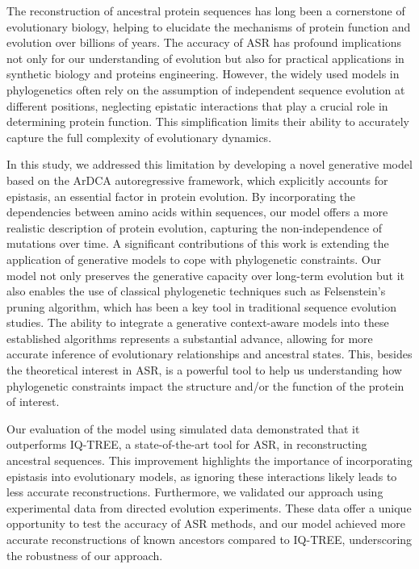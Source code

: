 The reconstruction of ancestral protein sequences has long been a cornerstone of evolutionary biology, helping to elucidate the mechanisms of protein function and evolution over billions of years. 
The accuracy of ASR has profound implications not only for our understanding of evolution but also for practical applications in synthetic biology and proteins engineering. 
However, the widely used models in phylogenetics often rely on the assumption of independent sequence evolution at different positions, neglecting epistatic interactions that play a crucial role in determining protein function. 
This simplification limits their ability to accurately capture the full complexity of evolutionary dynamics.

In this study, we addressed this limitation by developing a novel generative model based on the ArDCA autoregressive framework, which explicitly accounts for epistasis, an essential factor in protein evolution. 
By incorporating the dependencies between amino acids within sequences, our model offers a more realistic description of protein evolution, capturing the non-independence of mutations over time.
A significant contributions of this work is extending the application of generative models to cope with phylogenetic constraints. 
Our model not only preserves the generative capacity over long-term evolution but it also enables the use of classical phylogenetic techniques such as Felsenstein’s pruning algorithm, which has been a key tool in traditional sequence evolution studies. 
The ability to integrate a generative context-aware models into these established algorithms represents a substantial advance, allowing for more accurate inference of evolutionary relationships and ancestral states. 
This, besides the theoretical interest in ASR, is a powerful tool to help us understanding how phylogenetic constraints impact the structure and/or the function of the protein of interest. 

Our evaluation of the model using simulated data demonstrated that it outperforms IQ-TREE, a state-of-the-art tool for ASR, in reconstructing ancestral sequences. 
This improvement highlights the importance of incorporating epistasis into evolutionary models, as ignoring these interactions likely leads to less accurate reconstructions. 
Furthermore, we validated our approach using experimental data from directed evolution experiments. 
These data offer a unique opportunity to test the accuracy of ASR methods, and our model achieved more accurate reconstructions of known ancestors compared to IQ-TREE, underscoring the robustness of our approach.


